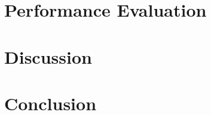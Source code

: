 \documentclass[12pt]{article}
\begin{document}
\part{Performance Evaluation}

\part{Discussion}

\part{Conclusion}



\end{document}
